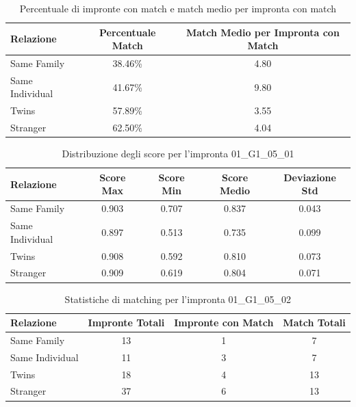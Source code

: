 \begin{table}[htbp]
\centering
\caption{Percentuale di impronte con match e match medio per impronta con match}
\label{tab:match_percentage_01_G1_05_01}
\begin{tabular}{|l|c|c|}
\hline
\textbf{Relazione} & \textbf{Percentuale Match} & \textbf{Match Medio per Impronta con Match} \\
\hline
Same Family & 38.46\% & 4.80 \\
\hline
Same Individual & 41.67\% & 9.80 \\
\hline
Twins & 57.89\% & 3.55 \\
\hline
Stranger & 62.50\% & 4.04 \\
\hline
\end{tabular}
\end{table}


\begin{table}[htbp]
\centering
\caption{Distribuzione degli score per l'impronta 01\_G1\_05\_01}
\label{tab:scores_01_G1_05_01}
\begin{tabular}{|l|c|c|c|c|}
\hline
\textbf{Relazione} & \textbf{Score Max} & \textbf{Score Min} & \textbf{Score Medio} & \textbf{Deviazione Std} \\
\hline
Same Family & 0.903 & 0.707 & 0.837 & 0.043 \\
\hline
Same Individual & 0.897 & 0.513 & 0.735 & 0.099 \\
\hline
Twins & 0.908 & 0.592 & 0.810 & 0.073 \\
\hline
Stranger & 0.909 & 0.619 & 0.804 & 0.071 \\
\hline
\end{tabular}
\end{table}


\begin{table}[htbp]
\centering
\caption{Statistiche di matching per l'impronta 01\_G1\_05\_02}
\label{tab:results_01_G1_05_02}
\begin{tabular}{|l|c|c|c|}
\hline
\textbf{Relazione} & \textbf{Impronte Totali} & \textbf{Impronte con Match} & \textbf{Match Totali} \\
\hline
Same Family & 13 & 1 & 7 \\
\hline
Same Individual & 11 & 3 & 7 \\
\hline
Twins & 18 & 4 & 13 \\
\hline
Stranger & 37 & 6 & 13 \\
\hline
\end{tabular}
\end{table}


